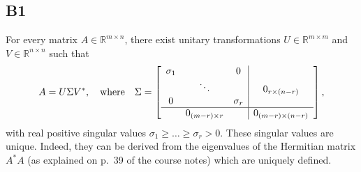 \documentclass[11pt]{article}
\newcommand{\real}{\mathbb{R}} %
\newcommand{\snorm}[1]{\norm{#1}_2} %
\begin{document}
\subsection*{B1}
For every matrix \(A \in \real^{m \times n}\), there exist unitary transformations \(U \in \real^{m \times m}\) and \(V \in \real^{n \times n}\) such that
\[
A = U \Sigma V^*, \quad \textnormal{where}\quad \Sigma = \left[\begin{array}{ccc|c}
\sigma_1 & & 0 & \\
& \ddots & & 0_{r \times (n-r)}\\
0 && \sigma_r & \\
\hline
& 0_{(m-r) \times r} & & 0_{(m-r) \times (n-r)}
\end{array}\right],
\]
with real positive singular values \(\sigma_1 \geqslant \dots \geqslant \sigma_r > 0\).
These singular values are unique. Indeed, they can be derived from the eigenvalues of the Hermitian matrix $A^*A$ (as explained on p.~39 of the course notes) which are uniquely defined.
\end{document}
